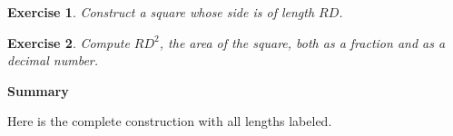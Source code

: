 \documentclass[11pt,a4paper]{report}
\newtheorem{exercise}{Exercise}
\begin{document}
\begin{exercise}
Construct a square whose side is of length $RD$.
\end{exercise}

\begin{exercise}
Compute $RD^2$, the area of the square, both as a fraction and as a decimal number.
\end{exercise}

\newpage


\begin{center}
\textbf{\Large Summary}
\end{center}

Here is the complete construction with all lengths labeled.

\bigskip
\end{document}

